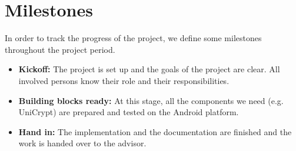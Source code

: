 \documentclass[numbers=noenddot, abstract=on, a4paper, headsepline,
footsepline, oneside, draft=off]{scrreprt}
\begin{document}
\section{Milestones}
\label{sec:milestones}
In order to track the progress of the project, we define some milestones
throughout the project period.
\begin{itemize}
  \item \textbf{Kickoff:} The project is set up and the goals of the project
  are clear. All involved persons know their role and their responsibilities.
  \item \textbf{Building blocks ready:} At this stage, all the components we
  need (e.g. UniCrypt) are prepared and tested on the Android platform.
  \item \textbf{Hand in:} The implementation and the documentation are finished
  and the work is handed over to the advisor.
\end{itemize}

\printbibliography
\end{document}
